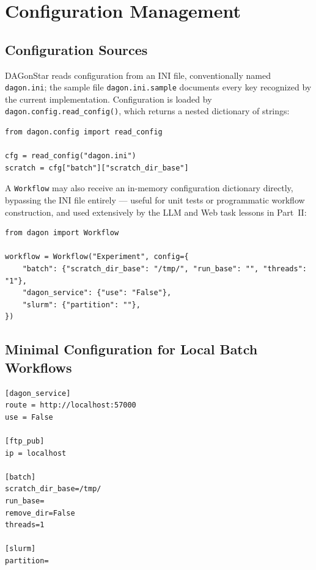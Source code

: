 \chapter{Configuration Management}
\label{ch:configuration}

\section{Configuration Sources}

DAGonStar reads configuration from an INI file, conventionally named
\texttt{dagon.ini}; the sample file \texttt{dagon.ini.sample} documents every
key recognized by the current implementation. Configuration is loaded by
\texttt{dagon.config.read\_config()}, which returns a nested dictionary of
strings:

\begin{lstlisting}[caption={Reading configuration programmatically.}]
from dagon.config import read_config

cfg = read_config("dagon.ini")
scratch = cfg["batch"]["scratch_dir_base"]
\end{lstlisting}

A \texttt{Workflow} may also receive an in-memory configuration dictionary
directly, bypassing the INI file entirely --- useful for unit tests or
programmatic workflow construction, and used extensively by the LLM and Web
task lessons in Part~II:

\begin{lstlisting}[caption={In-memory configuration.}]
from dagon import Workflow

workflow = Workflow("Experiment", config={
    "batch": {"scratch_dir_base": "/tmp/", "run_base": "", "threads": "1"},
    "dagon_service": {"use": "False"},
    "slurm": {"partition": ""},
})
\end{lstlisting}

\section{Minimal Configuration for Local Batch Workflows}

\begin{lstlisting}[style=ini]
[dagon_service]
route = http://localhost:57000
use = False

[ftp_pub]
ip = localhost

[batch]
scratch_dir_base=/tmp/
run_base=
remove_dir=False
threads=1

[slurm]
partition=
\end{lstlisting}

